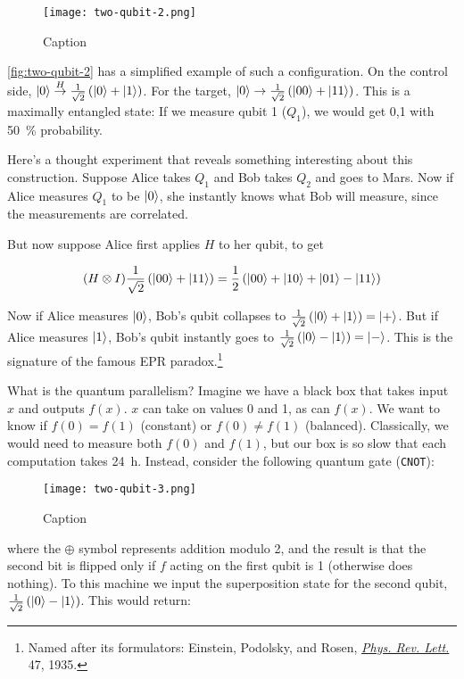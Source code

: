 \documentclass[12pt, english]{book}
\begin{document}
\begin{figure}[!ht]
	\centering
	\texttt{[image: two-qubit-2.png]}
	\caption{Caption}
	\label{fig:two-qubit-2}
\end{figure}

\autoref{fig:two-qubit-2} has a simplified example of such a configuration.
On the control side, $\ket{0} \stackrel{H}{\rightarrow} \frac{1}{\sqrt{2}} \left( \ket{0} + \ket{1} \right)$.
For the target, $\ket{0} \rightarrow \frac{1}{\sqrt{2}} \left( \ket{00} + \ket{11} \right)$.
This is a maximally entangled state: If we measure qubit 1 ($Q_1$), we would get 0,1 with \SI{50}{\percent} probability.

Here's a thought experiment that reveals something interesting about this construction.
Suppose Alice takes $Q_1$ and Bob takes $Q_2$ and goes to Mars.
Now if Alice measures $Q_1$ to be $\ket{0}$, she instantly knows what Bob will measure, since the measurements are correlated.

But now suppose Alice first applies $H$ to her qubit, to get

\[ (H \otimes I) \frac{1}{\sqrt{2}} \left( \ket{00} + \ket{11} \right) = \frac{1}{2} \left( \ket{00} + \ket{10} + \ket{01} - \ket{11} \right) \]

Now if Alice measures $\ket{0}$, Bob's qubit collapses to $\frac{1}{\sqrt{2}} \left( \ket{0} + \ket{1} \right) = \ket{+}$.
But if Alice measures $\ket{1}$, Bob's qubit instantly goes to $\frac{1}{\sqrt{2}} \left( \ket{0} - \ket{1} \right) = \ket{-}$.
This is the signature of the famous EPR paradox.\footnote{Named after its formulators: Einstein, Podolsky, and Rosen, \href{https://link.aps.org/doi/10.1103/PhysRev.47.777}{\emph{Phys. Rev. Lett.}} 47, 1935.}

What is the quantum parallelism? 
Imagine we have a black box that takes input $x$ and outputs $f(x)$.
$x$ can take on values 0 and 1, as can $f(x)$.
We want to know if $f(0) = f(1)$ (constant) or $f(0) \neq f(1)$ (balanced).
Classically, we would need to measure both $f(0)$ and $f(1)$, but our box is so slow that each computation takes \SI{24}{\hour}. 
Instead, consider the following quantum gate (\texttt{CNOT}):

\begin{figure}[!ht]
	\centering
	\texttt{[image: two-qubit-3.png]}
	\caption{Caption}
	\label{fig:two-qubit-3}
\end{figure}

where the $\oplus$ symbol represents addition modulo 2, and the result is that the second bit is flipped only if $f$ acting on the first qubit is 1 (otherwise does nothing).
To this machine we input the superposition state for the second qubit, $\frac{1}{\sqrt{2}}\left( \ket{0} - \ket{1} \right)$.
This would return:
\end{document}

